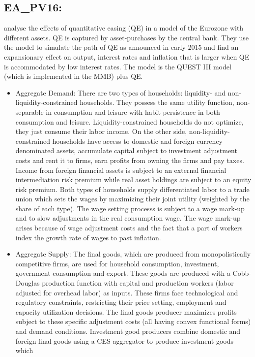 \documentclass[11pt,a4paper]{article}
\begin{document}
	
	\subsection{EA\_PV16: \cite{priftis2016portfolio}}
	\label{EAPV16}
	\cite{priftis2016portfolio} analyse the effects of quantitative easing (QE) in a model of the Eurozone with different assets. QE is captured by asset-purchases by the central bank. They use the model to simulate the path of QE as announced in early 2015 and find an expansionary effect on output, interest rates and inflation that is larger when QE is accommodated by low interest rates. The model is the QUEST III model (which is implemented in the MMB) plus QE.
	\begin{itemize}
		\item Aggregate  Demand:  There are two types of households: liquidity- and non-liquidity-constrained households. They possess the same utility function, non-separable in consumption and leisure with habit persistence in both consumption and leisure. Liquidity-constrained households do not optimize, they just consume their labor income. On the other side, non-liquidity-constrained households have access to domestic and foreign currency denominated assets, accumulate capital subject to investment adjustment costs and rent it to firms, earn profits from owning the firms and pay taxes. Income from foreign financial assets is subject to an external financial intermediation risk premium while real asset holdings are subject to an equity risk premium. Both types of households supply differentiated labor to a trade union which sets the wages by maximizing their joint utility (weighted by the share of each type). The wage setting processs is subject to a wage mark-up and to slow adjustments in the real consumption wage. The wage mark-up arises because of wage adjustment costs and the fact that a part of workers index the growth rate of wages to past inflation.
		\item Aggregate  Supply:  The final goods, which are produced from monopolistically competitive firms, are used for household consumption, investment, government consumption and export. These goods are produced with a Cobb-Douglas production function with capital and production workers (labor adjusted for overhead labor) as inputs. These firms face technological and regulatory constraints, restricting their price setting, employment and capacity utilization decisions. The final goods producer maximizes profits subject to these specific adjustment costs (all having convex functional forms) and demand conditions. Investment good producers combine domestic and foreign final goods using a CES aggregator to produce investment goods which

\end{itemize}
\end{document}
